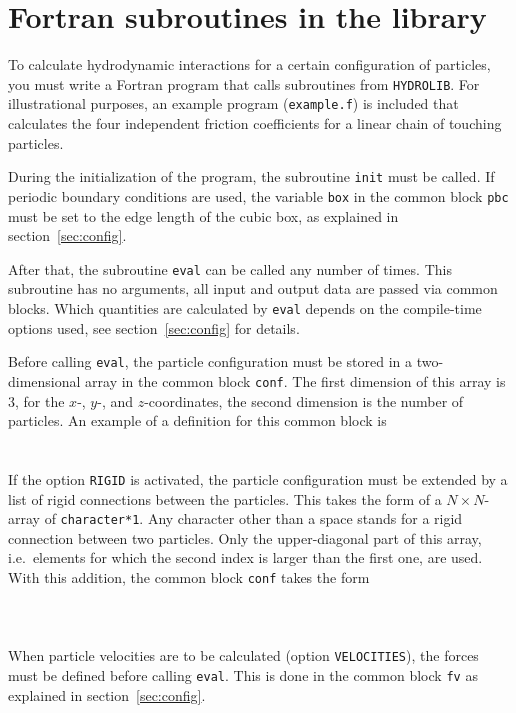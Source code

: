 \documentclass[12pt]{article}
\newcommand{\prog}[1]{{\tt #1}}
\newcommand{\wsp}{\hspace*{0.5cm}}
\begin{document}
\section{Fortran subroutines in the library}
\label{sec:imp}

To calculate hydrodynamic interactions for a certain configuration of
particles, you must write a Fortran program that calls subroutines
from \prog{HYDROLIB}. For illustrational
purposes, an example program (\prog{example.f}) is included that
calculates the four independent friction coefficients for a linear
chain of touching particles.

During the initialization of the program, the subroutine \prog{init}
must be called. If periodic boundary conditions are used, the
variable \prog{box} in the common block \prog{pbc} must be set to the
edge length of the cubic box, as explained in section~\ref{sec:config}.

After that, the subroutine \prog{eval} can be called any number of times.
This subroutine has no arguments, all input and output data are
passed via common blocks. Which quantities are calculated by
\prog{eval} depends on the compile-time options used, see
section~\ref{sec:config} for details.

Before calling \prog{eval}, the particle configuration must be
stored in a two-dimensional array in the
common block \prog{conf}. The first dimension of this array is 3, for
the $x$-, $y$-, and $z$-coordinates, the second dimension is the
number of particles. An example of a definition for this common block
is\\
\wsp\prog{real c(3,\_NP\_)}\\
\wsp\prog{common /conf/ c}\\
If the option \prog{RIGID} is activated, the particle configuration
must be extended by a list of rigid connections between the particles.
This takes the form of a $N\times N$-array of \prog{character*1}. Any
character other than a space stands for a rigid connection between
two particles. Only the upper-diagonal part of this array, i.e.\ elements
for which the second index is larger than the first one, are used.
With this addition, the common block \prog{conf} takes the form\\
\wsp\prog{real c(3,\_NP\_)}\\
\wsp\prog{character*1 cnct(\_NP\_,\_NP\_)}\\
\wsp\prog{common /conf/ c,cnct}\\

When particle velocities are to be calculated (option
\prog{VELOCITIES}), the forces must be defined before calling
\prog{eval}. This is done in the common block
\prog{fv} as explained in section~\ref{sec:config}.
\end{document}
